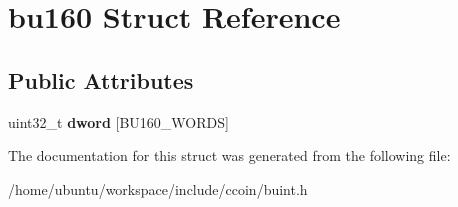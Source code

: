 \hypertarget{structbu160}{\section{bu160 Struct Reference}
\label{structbu160}
}
\subsection*{Public Attributes}
\begin{DoxyCompactItemize}
\item 
\hypertarget{structbu160_a77c251b87980b1a0a259b009e605f519}{uint32\-\_\-t {\bfseries dword} \mbox{[}B\-U160\-\_\-\-W\-O\-R\-D\-S\mbox{]}}\label{structbu160_a77c251b87980b1a0a259b009e605f519}

\end{DoxyCompactItemize}


The documentation for this struct was generated from the following file\-:\begin{DoxyCompactItemize}
\item 
/home/ubuntu/workspace/include/ccoin/buint.\-h\end{DoxyCompactItemize}
